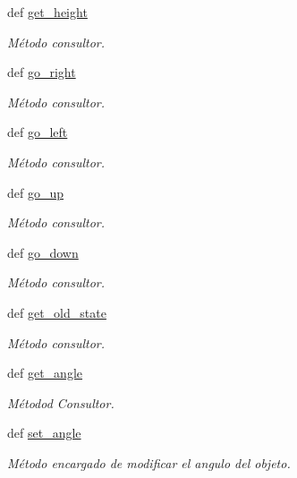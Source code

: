 \begin{DoxyCompactItemize}
def \hyperlink{classengine_1_1gameobject_1_1GameObject_af87a14e4c627792904a9fafa52a82906}{get\-\_\-height}
\begin{DoxyCompactList}\small\item\em \-Método consultor. \end{DoxyCompactList}\item 
def \hyperlink{classengine_1_1gameobject_1_1GameObject_ac90b918eb819e0d4e61b5607a12e6da0}{go\-\_\-right}
\begin{DoxyCompactList}\small\item\em \-Método consultor. \end{DoxyCompactList}\item 
def \hyperlink{classengine_1_1gameobject_1_1GameObject_a5e067b49e971f25b7b6d36a8ba612749}{go\-\_\-left}
\begin{DoxyCompactList}\small\item\em \-Método consultor. \end{DoxyCompactList}\item 
def \hyperlink{classengine_1_1gameobject_1_1GameObject_a782538c7e50b601c10b6ada8d76c16b0}{go\-\_\-up}
\begin{DoxyCompactList}\small\item\em \-Método consultor. \end{DoxyCompactList}\item 
def \hyperlink{classengine_1_1gameobject_1_1GameObject_af1477d75e44b14879e97c29900963053}{go\-\_\-down}
\begin{DoxyCompactList}\small\item\em \-Método consultor. \end{DoxyCompactList}\item 
def \hyperlink{classengine_1_1gameobject_1_1GameObject_a9473a667d9a8411e28a985f90d42d5ef}{get\-\_\-old\-\_\-state}
\begin{DoxyCompactList}\small\item\em \-Método consultor. \end{DoxyCompactList}\item 
def \hyperlink{classengine_1_1gameobject_1_1GameObject_ac71a0ee9642665c1111042256d561afd}{get\-\_\-angle}
\begin{DoxyCompactList}\small\item\em \-Métodod \-Consultor. \end{DoxyCompactList}\item 
def \hyperlink{classengine_1_1gameobject_1_1GameObject_a123d4e25c8708297e6e7a2a6c0aa0a6e}{set\-\_\-angle}
\begin{DoxyCompactList}\small\item\em \-Método encargado de modificar el angulo del objeto. \end{DoxyCompactList}\end{DoxyCompactItemize}
